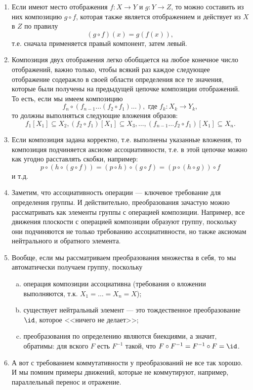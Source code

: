 \begin{enumerate}
\item Если имеют место отображения $f:X\to Y$ и $g:Y\to Z$, то можно составить из них композицию $g\circ f$, которая также является отображением и действует из $X$ в $Z$ по правилу
$$
(g\circ f)(x)=g(f(x)),
$$
т.е. сначала применяется правый компонент, затем левый.
\item Композиция двух отображения легко обобщается на любое конечное число отображений, важно только, чтобы всякий раз каждое следующее отображение содеражло в своей области определения все те значения, которые были получены на предыдущей цепочке композиции отображений. То есть, если мы имеем композицию
$$
f_n\circ (f_{n-1}\dots (f_2\circ f_1)\dots),\mbox{ где }f_k:X_k\to Y_k,
$$
то должны выполняться следующие вложения образов:
$$
f_1[X_1]\subseteq X_2,(f_2\circ f_1)[X_1]\subseteq X_3,\dots,(f_{n-1}\dots f_2\circ f_1)[X_1]\subseteq X_n.
$$
\item Если композиция задана корректно, т.е. выполнены указанные вложения, то композиция подчиняется аксиоме ассоциативности, т.е. в этой цепочке можно как угодно расставлять скобки, например:
$$
p\circ (h\circ (g\circ f)) = (p\circ h)\circ (g\circ f) = (p\circ (h\circ g))\circ f
$$
и т.д.
\item Заметим, что ассоциативность операции --- ключевое требование для определения группы. И действительно, преобразования зачастую можно рассматривать как элементы группы с операцией композиции. Например, все движения плоскости с операцией композиции образуют группу, поскольку они подчиняются не только требованию ассоциативности, но также аксиомам нейтрального и обратного элемента.
\item Вообще, если мы рассматриваем преобразования множества в себя, то мы автоматически получаем группу, поскольку
\begin{enumerate}[a)]
\item операция композиции ассоциативна (требования о вложении выполняются, т.к. $X_1=\dots=X_n=X$);
\item существует нейтральный элемент --- это тождественное преобразование $\id$, которое <<ничего не делает>>;
\item преобразования по определению являются биекциями, а значит, обратимы: для вского $F$ есть $F^{-1}$ такой, что $F\circ F^{-1}=F^{-1}\circ F=\id$.
\end{enumerate}
\item А вот с требованием коммутативности у преобразований не все так хорошо. И мы помним примеры движений, которые не коммутируют, например, параллельный перенос и отражение.





\end{enumerate}
